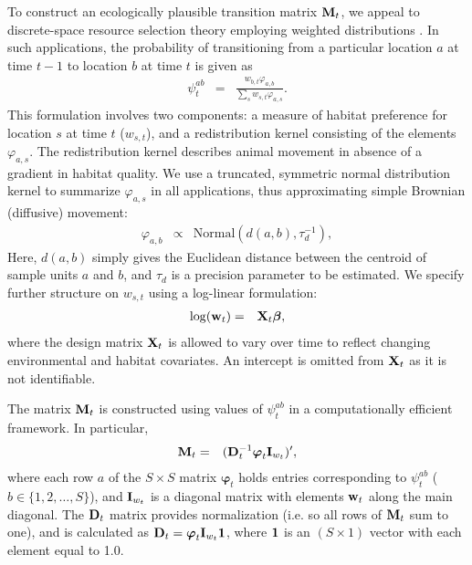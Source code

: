 \documentclass[12pt,fleqn]{article}
\begin{document}
\begin{flushleft}
\hspace{.5in}To construct an ecologically plausible transition matrix ${\bf M}_t$, we appeal to discrete-space resource selection theory employing weighted distributions \citep[cf.][]{PatilRao1978,LeleKeim2006}.  In such applications, the probability of transitioning from a particular location $a$ at time $t-1$ to location $b$ at time $t$ is given as
\begin{eqnarray*}
  \psi^{ab}_t & = & \frac{w_{b,t} \varphi_{a,b}}{\sum_s w_{s,t} \varphi_{a,s}}. \label{eq:psi}
\end{eqnarray*}
This formulation involves two components: a measure of habitat preference for location $s$ at time $t$ ($w_{s,t}$), and a redistribution kernel consisting of the elements $\varphi_{a,s}$.  The redistribution kernel describes animal movement in absence of a gradient in habitat quality.  We use a truncated, symmetric normal distribution kernel to summarize $\varphi_{a,s}$ in all applications, thus approximating simple Brownian (diffusive) movement:
\begin{eqnarray*}
  \varphi_{a,b} & \propto & \textrm{Normal}(d(a,b),\tau_d^{-1}), \label{eq:varphi}
\end{eqnarray*}
Here, $d(a,b)$ simply gives the Euclidean distance between the centroid of sample units $a$ and $b$, and $\tau_d$ is a precision parameter to be estimated.  We specify further structure on $w_{s,t}$ using a log-linear formulation:
\begin{eqnarray*}
  \log({\bf w}_t) & = & {\bf X}_t \boldsymbol{\beta}, %
\end{eqnarray*}
where the design matrix ${\bf X}_t$ is allowed to vary over time to reflect changing environmental and habitat covariates.  An intercept is omitted from ${\bf X}_t$ as it is not identifiable.

\hspace{.5in}The matrix ${\bf M}_t$ is constructed using values of $\psi_t^{ab}$ in a computationally efficient framework.  In particular,
\begin{eqnarray}
  {\bf M}_t & = & ({\bf D}_t^{-1} \boldsymbol{\varphi}_t {\bf I}_{w_t})^\prime, \label{eq:M}
\end{eqnarray}
where each row $a$ of the $S \times S$ matrix $\boldsymbol{\varphi}_t$ holds entries corresponding to $\psi_t^{ab}$ ($b \in \{ 1,2,\hdots,S \}$), and ${\bf I}_{w_t}$ is a diagonal matrix with elements ${\bf w}_t$ along the main diagonal.  The  ${\bf D}_t$ matrix provides normalization (i.e. so all rows of ${\bf M}_t$ sum to one), and is calculated as ${\bf D}_t = \boldsymbol{\varphi}_t {\bf I}_{w_t} {\bf 1}$, where ${\bf 1}$ is an $(S \times 1)$ vector with each element equal to 1.0.


\end{flushleft}
\end{document}
